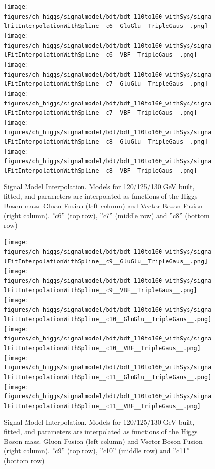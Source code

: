 \begin{figure}[htbp]
  \centering
  \texttt{[image: figures/ch\_higgs/signalmodel/bdt/bdt\_110to160\_withSys/signalFitInterpolationWithSpline\_\_c6\_\_GluGlu\_\_TripleGaus\_\_.png]}
  \texttt{[image: figures/ch\_higgs/signalmodel/bdt/bdt\_110to160\_withSys/signalFitInterpolationWithSpline\_\_c6\_\_VBF\_\_TripleGaus\_\_.png]}\\
  \texttt{[image: figures/ch\_higgs/signalmodel/bdt/bdt\_110to160\_withSys/signalFitInterpolationWithSpline\_\_c7\_\_GluGlu\_\_TripleGaus\_\_.png]}
  \texttt{[image: figures/ch\_higgs/signalmodel/bdt/bdt\_110to160\_withSys/signalFitInterpolationWithSpline\_\_c7\_\_VBF\_\_TripleGaus\_\_.png]}\\
  \texttt{[image: figures/ch\_higgs/signalmodel/bdt/bdt\_110to160\_withSys/signalFitInterpolationWithSpline\_\_c8\_\_GluGlu\_\_TripleGaus\_\_.png]}
  \texttt{[image: figures/ch\_higgs/signalmodel/bdt/bdt\_110to160\_withSys/signalFitInterpolationWithSpline\_\_c8\_\_VBF\_\_TripleGaus\_\_.png]}
  \caption{Signal Model Interpolation. Models for 120/125/130 GeV built, fitted, and parameters are interpolated as functions of the Higgs Boson mass. Gluon Fusion (left column) and Vector Boson Fusion (right column). ''c6'' (top row), ''c7'' (middle row) and ''c8'' (bottom row)}
  \label{fig:higgs_signalmodel_gluvbfc3c5}
\end{figure}
\begin{figure}[htbp]
  \centering
  \texttt{[image: figures/ch\_higgs/signalmodel/bdt/bdt\_110to160\_withSys/signalFitInterpolationWithSpline\_\_c9\_\_GluGlu\_\_TripleGaus\_\_.png]}
  \texttt{[image: figures/ch\_higgs/signalmodel/bdt/bdt\_110to160\_withSys/signalFitInterpolationWithSpline\_\_c9\_\_VBF\_\_TripleGaus\_\_.png]}\\
  \texttt{[image: figures/ch\_higgs/signalmodel/bdt/bdt\_110to160\_withSys/signalFitInterpolationWithSpline\_\_c10\_\_GluGlu\_\_TripleGaus\_\_.png]}
  \texttt{[image: figures/ch\_higgs/signalmodel/bdt/bdt\_110to160\_withSys/signalFitInterpolationWithSpline\_\_c10\_\_VBF\_\_TripleGaus\_\_.png]}\\
  \texttt{[image: figures/ch\_higgs/signalmodel/bdt/bdt\_110to160\_withSys/signalFitInterpolationWithSpline\_\_c11\_\_GluGlu\_\_TripleGaus\_\_.png]}
  \texttt{[image: figures/ch\_higgs/signalmodel/bdt/bdt\_110to160\_withSys/signalFitInterpolationWithSpline\_\_c11\_\_VBF\_\_TripleGaus\_\_.png]}
  \caption{Signal Model Interpolation. Models for 120/125/130 GeV built, fitted, and parameters are interpolated as functions of the Higgs Boson mass. Gluon Fusion (left column) and Vector Boson Fusion (right column). ''c9'' (top row), ''c10'' (middle row) and ''c11'' (bottom row)}
  \label{fig:higgs_signalmodel_gluvbfc3c5}
\end{figure}

